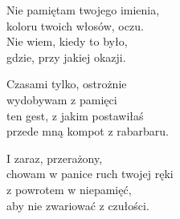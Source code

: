 \begin{text}
    Nie pamiętam twojego imienia,\\
    koloru twoich włosów, oczu.\\
    Nie wiem, kiedy to było,\\
    gdzie, przy jakiej okazji.

    Czasami tylko, ostrożnie\\
    wydobywam z pamięci\\
    ten gest, z jakim postawiłaś\\
    przede mną kompot z rabarbaru.

    I zaraz, przerażony,\\
    chowam w panice ruch twojej ręki\\
    z powrotem w niepamięć,\\
    aby nie zwariować z czułości.
\end{text}
\begin{chord}

\end{chord}